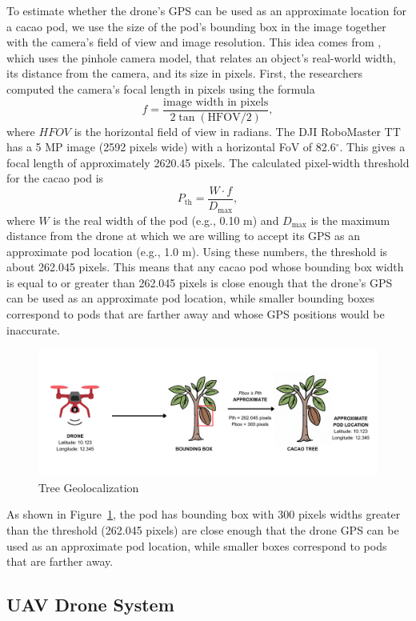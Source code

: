 To estimate whether the drone's GPS can be used as an approximate location for a cacao pod, we use the size of the pod's bounding box in the image together with the camera's field of view and image resolution. This idea comes from \cite{leorna2022estimating}, which uses the pinhole camera model, that relates an object's real-world width, its distance from the camera, and its size in pixels. First, the researchers computed the camera's focal length in pixels using the formula
\[
f = \frac{\text{image width in pixels}}{2\tan(\text{HFOV}/2)},
\]
where $HFOV$ is the horizontal field of view in radians. The DJI RoboMaster TT has a 5 MP image (2592 pixels wide) with a horizontal FoV of 82.6$^\circ$. This gives a focal length of approximately 2620.45 pixels. The calculated pixel-width threshold for the cacao pod is
\[
P_{\text{th}} = \frac{W \cdot f}{D_{\max}},
\]
where $W$ is the real width of the pod (e.g., 0.10 m) and $D_{\max}$ is the maximum distance from the drone at which we are willing to accept its GPS as an approximate pod location (e.g., 1.0 m). Using these numbers, the threshold is about 262.045 pixels. This means that any cacao pod whose bounding box width is equal to or greater than 262.045 pixels is close enough that the drone's GPS can be used as an approximate pod location, while smaller bounding boxes correspond to pods that are farther away and whose GPS positions would be inaccurate.

\begin{figure}[H]
	\centering
	\caption{Tree Geolocalization}
	\label{fig:tree}
	\includegraphics[width=1\textwidth]{figures/Tree Geolocalization.pdf}
\end{figure}

As shown in Figure~\ref{fig:tree}, the pod has bounding box with 300 pixels widths greater than the threshold (262.045 pixels) are close enough that the drone GPS can be used as an approximate pod location, while smaller boxes correspond to pods that are farther away.

\subsection{UAV Drone System}

